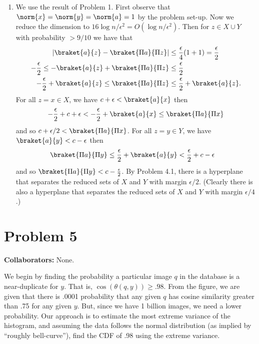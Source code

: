 \begin{enumerate}
    \item We use the result of Problem 1.
    First observe that $\norm{x}=\norm{y}=\norm{a}=1$
    by the problem set-up.
    Now we reduce the dimension to
    $16\log n/\epsilon^2=O(\log n/\epsilon^2)$.
    Then for $z \in X \cup Y$ with probability
    $>9/10$ we have that
    \begin{align}
        |\braket{a}{z}-\braket{\Pi a}{\Pi z}|
        &\leq \frac{\epsilon}{4}(1+1) = \frac{\epsilon}{2}
        \nonumber \\
        -\frac{\epsilon}{2} \leq -\braket{a}{z}+\braket{\Pi a}{\Pi z}
        &\leq \frac{\epsilon}{2}
        \nonumber \\
        -\frac{\epsilon}{2} +\braket{a}{z} \leq 
        \braket{\Pi a}{\Pi z} &\leq \frac{\epsilon}{2}
        + \braket{a}{z}.
        \nonumber
    \end{align} 
    For all $z=x\in X$,
    we have $c+\epsilon < \braket{a}{x}$ then
    \begin{align}
        - \frac{\epsilon}{2} + c+\epsilon < 
        -\frac{\epsilon}{2} +\braket{a}{x} \leq 
        \braket{\Pi a}{\Pi x}
        \nonumber
    \end{align}
    and so $c + \epsilon/2 < \braket{\Pi a}{\Pi x}$.
    For all $z=y\in Y$,
    we have $\braket{a}{y} < c - \epsilon$ then
    \begin{align}
        \braket{\Pi a}{\Pi y} &\leq \frac{\epsilon}{2}
        + \braket{a}{y} < \frac{\epsilon}{2} +
        c - \epsilon
        \nonumber
    \end{align}
    and so $\braket{\Pi a}{\Pi y} < c - \frac{\epsilon}{2}$.
    By Problem 4.1, there is a hyperplane that separates
    the reduced sets of $X$ and $Y$ with margin $\epsilon/2$.
    (Clearly there is also a hyperplane that
    separates the reduced sets of $X$ and $Y$ with margin
    $\epsilon/4$.)

\end{enumerate}

\newpage
\section*{Problem 5}
\textbf{Collaborators:}  None.
\medskip

We begin by finding the probability
a particular image $q$ in the database
is a near-duplicate for $y$.
That is, $\cos(\theta(q,y)) \geq .98$.
From the figure, we are given that there is
.0001 probability that any given $q$
has cosine similarity greater than .75 
for any given $y$.
But, since we have 1 billion images,
we need a lower probability.
Our approach is to estimate the most
extreme variance of the histogram,
and assuming the data follows
the normal distribution (as implied by
``roughly bell-curve''), find
the CDF of .98 using the extreme variance.

